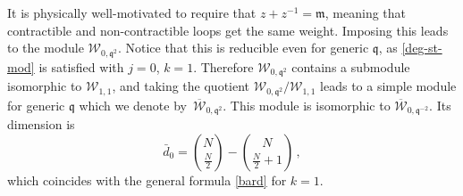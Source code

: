 \documentclass[a4paper,10pt]{article}
\newcommand{\q}{\mathfrak{q}}
\newcommand{\aSt}{\mathcal{W}}
\newcommand{\AStTL}[2]{\aSt_{#1,#2}}
\newcommand{\bAStTL}[2]{\overline{\mathcal{W}}_{#1,#2}}
\newcommand{\m}{\mathfrak{m}}
\begin{document}
It is physically well-motivated to require that $z+z^{-1}=\m$, meaning that contractible and non-contractible loops get the same weight. Imposing this
leads to the module $\AStTL{0}{\q^2}$. Notice that this is reducible
even for generic $\q$, as \eqref{deg-st-mod} is satisfied with $j=0$, $k=1$. Therefore $\AStTL{0}{\q^2}$ contains a submodule isomorphic to
$\AStTL{1}{1}$, and taking the quotient $\AStTL{0}{\q^2}/\AStTL{1}{1}$ leads to a simple module  for generic $\q$ which we denote 
by~$\bAStTL{0}{\q^2}$. This module is isomorphic to $\bAStTL{0}{\q^{-2}}$. Its dimension is
%
\begin{equation}
 \bar{d}_0=\binom{N}{\frac{N}{2}}-\binom{N}{\frac{N}{2}+1} \,,
\end{equation}
%
which coincides with the general formula \eqref{bard} for $k=1$.
\end{document}
